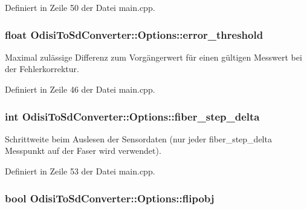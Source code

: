 Definiert in Zeile 50 der Datei main.\-cpp.

\hypertarget{structOdisiToSdConverter_1_1Options_a2d540b0bd36d458de7797792efb13f13}{
\subsubsection[{error\-\_\-threshold}]{\setlength{\rightskip}{0pt plus 5cm}float Odisi\-To\-Sd\-Converter\-::\-Options\-::error\-\_\-threshold}}\label{structOdisiToSdConverter_1_1Options_a2d540b0bd36d458de7797792efb13f13}


Maximal zulässige Differenz zum Vorgängerwert für einen gültigen Messwert bei der Fehlerkorrektur. 



Definiert in Zeile 46 der Datei main.\-cpp.

\hypertarget{structOdisiToSdConverter_1_1Options_a550a9730db03bc568f8ac51a269dd286}{
\subsubsection[{fiber\-\_\-step\-\_\-delta}]{\setlength{\rightskip}{0pt plus 5cm}int Odisi\-To\-Sd\-Converter\-::\-Options\-::fiber\-\_\-step\-\_\-delta}}\label{structOdisiToSdConverter_1_1Options_a550a9730db03bc568f8ac51a269dd286}


Schrittweite beim Auslesen der Sensordaten (nur jeder fiber\-\_\-step\-\_\-delta Messpunkt auf der Faser wird verwendet). 



Definiert in Zeile 53 der Datei main.\-cpp.

\hypertarget{structOdisiToSdConverter_1_1Options_a0117562823f70067df979f4975e5b076}{
\subsubsection[{flipobj}]{\setlength{\rightskip}{0pt plus 5cm}bool Odisi\-To\-Sd\-Converter\-::\-Options\-::flipobj}}\label{structOdisiToSdConverter_1_1Options_a0117562823f70067df979f4975e5b076}


